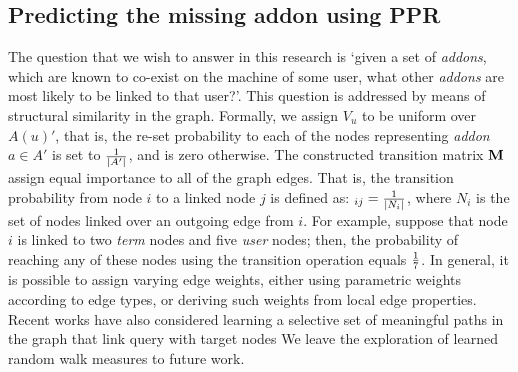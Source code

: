 \documentclass[11pt,oneside]{book}
\let\Oldsubsection\subsection
\renewcommand{\subsection}{\FloatBarrier\Oldsubsection}
\newcommand{\transition}{{\bf M}}
\begin{document}

\subsection{Predicting the missing addon using PPR}

The question that we wish to answer in this research is `given
a set of {\it addons}, which are known to co-exist on the machine of
some user, what other {\it addons} are most likely to be linked to
that user?'. This question is addressed by means of structural
similarity in the graph. Formally, we assign $V_u$ to be uniform over $A(u)'$, that is, the re-set probability to each of the nodes representing {\it addon} $a\in A'$ is set to ${1 \over \mid A' \mid}$, and is zero otherwise. The constructed transition matrix $\transition$ assign equal importance to all of
the graph edges. That is, the transition probability from node $i$ to
a linked node $j$ is defined as: $_{ij}={1 \over \mid N_i \mid}$,
where $N_i$ is the set of nodes linked over an outgoing edge from $i$. For example, suppose that node $i$ is linked to two {\it term} nodes and five {\it user} nodes; then, the probability of reaching any of these nodes using the transition operation equals ${1\over 7}$. In general, it is possible to assign varying edge weights, either using parametric weights according to edge types, or deriving such weights from local edge properties. Recent works have also considered learning a selective set of meaningful paths in the graph that link query with target nodes \citep{minkov2010improving,lao2010relational} We leave the exploration of learned random walk measures to future work. 
\end{document}
